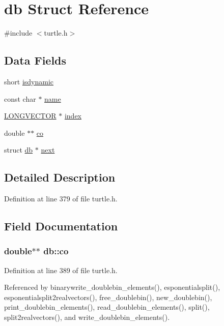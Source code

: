 \hypertarget{structdb}{\section{db Struct Reference}
\label{structdb}
}


{\ttfamily \#include $<$turtle.\-h$>$}

\subsection*{Data Fields}
\begin{DoxyCompactItemize}
\item 
short \hyperlink{structdb_abf7abcb6a3842253e33d03a3bfbcd635}{isdynamic}
\item 
const char $\ast$ \hyperlink{structdb_aa7ec388f1a607d03270c4d3b6488f7ce}{name}
\item 
\hyperlink{struct_l_o_n_g_v_e_c_t_o_r}{L\-O\-N\-G\-V\-E\-C\-T\-O\-R} $\ast$ \hyperlink{structdb_aadf749a679e24e7866bee9f005e2d271}{index}
\item 
double $\ast$$\ast$ \hyperlink{structdb_a09dc1d45754bd81c8f3896eddf1dbb58}{co}
\item 
struct \hyperlink{structdb}{db} $\ast$ \hyperlink{structdb_a7de19f5692d764d9f9ce76de4ef1de45}{next}
\end{DoxyCompactItemize}


\subsection{Detailed Description}


Definition at line 379 of file turtle.\-h.



\subsection{Field Documentation}
\hypertarget{structdb_a09dc1d45754bd81c8f3896eddf1dbb58}{
\subsubsection[{co}]{\setlength{\rightskip}{0pt plus 5cm}double$\ast$$\ast$ db\-::co}}\label{structdb_a09dc1d45754bd81c8f3896eddf1dbb58}


Definition at line 389 of file turtle.\-h.



Referenced by binarywrite\-\_\-doublebin\-\_\-elements(), esponentialsplit(), esponentialsplit2realvectors(), free\-\_\-doublebin(), new\-\_\-doublebin(), print\-\_\-doublebin\-\_\-elements(), read\-\_\-doublebin\-\_\-elements(), split(), split2realvectors(), and write\-\_\-doublebin\-\_\-elements().

